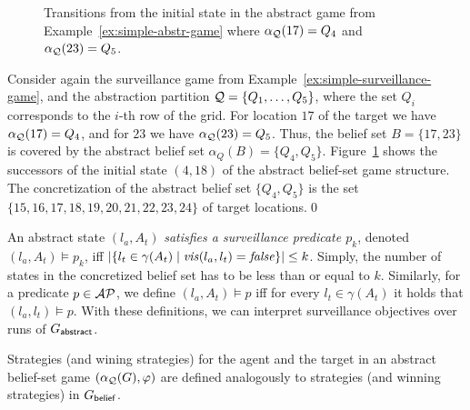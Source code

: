 \begin{figure}

\vspace{-.2cm}
\caption{Transitions from the initial state in the abstract game from Example~\ref{ex:simple-abstr-game} where $\alpha_{\mathcal{Q}}(17) = Q_4$ and $\alpha_{\mathcal{Q}}(23) = Q_5$.}
\label{fig:simple-abstr-game}
\vspace{-.7cm}
\end{figure}


\begin{example}\label{ex:simple-abstr-game}
Consider again the surveillance game from Example~\ref{ex:simple-surveillance-game}, and the abstraction partition $\mathcal{Q} = \{Q_1,\ldots,Q_5\}$, where the set $Q_i$ corresponds to the $i$-th row of the grid. For location $17$ of the target we have $\alpha_{\mathcal{Q}}(17) = Q_4$, and for  $23$ we have $\alpha_{\mathcal{Q}}(23) = Q_5$. Thus, the belief set $B = \{17,23\}$ is covered by the abstract belief set $\alpha_Q(B) = \{Q_4,Q_5\}$. Figure~\ref{fig:simple-abstr-game} shows the successors of the initial state $(4,18)$ of the abstract belief-set game structure. The concretization of the abstract belief set $\{Q_4,Q_5\}$ is the set $\{15,16,17,18,19,20,21,22,23,24\}$ of target locations.\qed
\end{example}

An abstract state $(l_a,A_t)$ \emph{satisfies a surveillance predicate $p_k$}, denoted $(l_a,A_t) \models p_k$, iff 
$|\{l_t \in \gamma(A_t) \mid \mathit{vis}(l_a,l_t)  = \mathit{false} \}| \leq k$. Simply, the number of states in the concretized belief set has to be less than or equal to $k$. Similarly, for a predicate $p \in \mathcal{AP}$, we define $(l_a,A_t) \models p$ iff for every $l_t \in \gamma(A_t)$ it holds that $(l_a,l_t) \models p$. With these definitions, we can interpret surveillance objectives over runs of $G_{\mathsf{abstract}}$.

Strategies (and wining strategies) for the agent and the target in an abstract belief-set game $(\alpha_{\mathcal{Q}}(G),\varphi)$ are defined analogously to strategies (and winning strategies) in $G_{\mathsf{belief}}$.